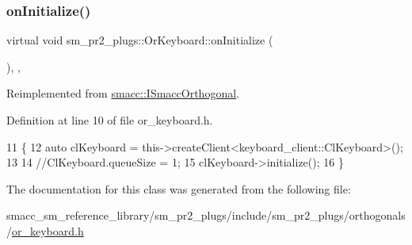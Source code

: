 \subsubsection{\texorpdfstring{on\+Initialize()}{onInitialize()}}
{\footnotesize\ttfamily virtual void sm\+\_\+pr2\+\_\+plugs\+::\+Or\+Keyboard\+::on\+Initialize (\begin{DoxyParamCaption}{ }\end{DoxyParamCaption})\hspace{0.3cm}{\ttfamily [inline]}, {\ttfamily [override]}, {\ttfamily [virtual]}}



Reimplemented from \hyperlink{classsmacc_1_1ISmaccOrthogonal_a6bb31c620cb64dd7b8417f8705c79c7a}{smacc\+::\+I\+Smacc\+Orthogonal}.



Definition at line 10 of file or\+\_\+keyboard.\+h.


\begin{DoxyCode}
11     \{
12         \textcolor{keyword}{auto} clKeyboard = this->createClient<keyboard\_client::ClKeyboard>();
13         
14         \textcolor{comment}{//ClKeyboard.queueSize = 1;}
15         clKeyboard->initialize();
16     \}
\end{DoxyCode}


The documentation for this class was generated from the following file\+:\begin{DoxyCompactItemize}
\item 
smacc\+\_\+sm\+\_\+reference\+\_\+library/sm\+\_\+pr2\+\_\+plugs/include/sm\+\_\+pr2\+\_\+plugs/orthogonals/\hyperlink{sm__pr2__plugs_2include_2sm__pr2__plugs_2orthogonals_2or__keyboard_8h}{or\+\_\+keyboard.\+h}\end{DoxyCompactItemize}
